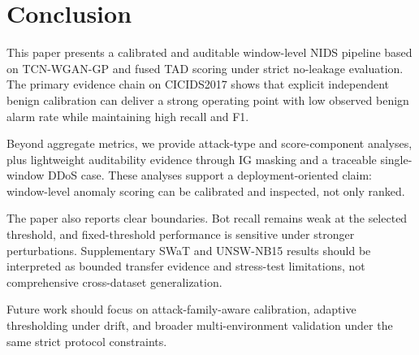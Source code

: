 \section{Conclusion}

This paper presents a calibrated and auditable window-level NIDS pipeline based on TCN-WGAN-GP and fused TAD scoring under strict no-leakage evaluation. The primary evidence chain on CICIDS2017 shows that explicit independent benign calibration can deliver a strong operating point with low observed benign alarm rate while maintaining high recall and F1.

Beyond aggregate metrics, we provide attack-type and score-component analyses, plus lightweight auditability evidence through IG masking and a traceable single-window DDoS case. These analyses support a deployment-oriented claim: window-level anomaly scoring can be calibrated and inspected, not only ranked.

The paper also reports clear boundaries. Bot recall remains weak at the selected threshold, and fixed-threshold performance is sensitive under stronger perturbations. Supplementary SWaT and UNSW-NB15 results should be interpreted as bounded transfer evidence and stress-test limitations, not comprehensive cross-dataset generalization.

Future work should focus on attack-family-aware calibration, adaptive thresholding under drift, and broader multi-environment validation under the same strict protocol constraints.
